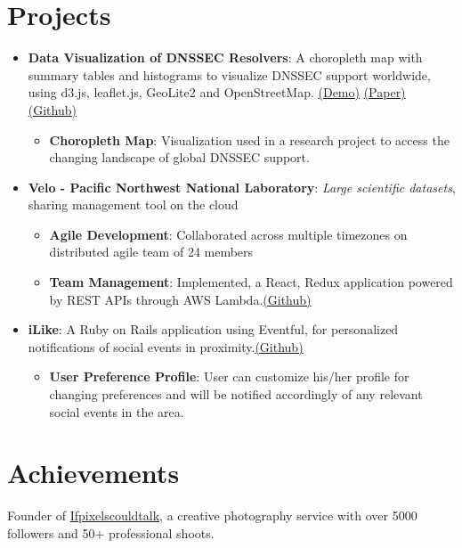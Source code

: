 \documentclass[letterpaper,9pt]{article}
\newcommand{\resumeItem}[2]{
  \item\small{
    \textbf{#1}{: #2 \vspace{-2pt}}
  }
}
\newcommand{\resumeSubItem}[2]{\resumeItem{#1}{#2}\vspace{-4pt}}
\newcommand{\resumeSubHeadingListStart}{\begin{itemize}[leftmargin=*]}
\newcommand{\resumeSubHeadingListEnd}{\end{itemize}}
\newcommand{\resumeItemListStart}{\begin{itemize}}
\newcommand{\resumeItemListEnd}{\end{itemize}\vspace{-5pt}}
\begin{document}
\section{Projects}
  \resumeSubHeadingListStart 
    \resumeSubItem{Data Visualization of DNSSEC Resolvers}
      {A choropleth map with summary tables and histograms to visualize DNSSEC support worldwide, using d3.js, leaflet.js, GeoLite2 and OpenStreetMap. \href{http://ec2-13-59-150-114.us-east-2.compute.amazonaws.com:3000/} {(Demo)} \href{https://drive.google.com/drive/folders/1Oc6g4fNo4LQgKQe8uxul2HIDKMQ-hzQZ/} {(Paper)} \href{https://github.com/shivachaturvedi/dnssec-viz} {(Github)}}
        \resumeItemListStart
            \resumeItem{Choropleth Map}{Visualization used in a research project to access the changing landscape of global DNSSEC support.}
        \resumeItemListEnd
    \resumeSubItem{Velo - Pacific Northwest National Laboratory}{\textit{Large scientific datasets}, sharing management tool on the cloud}
        \resumeItemListStart
            \resumeItem{Agile Development}{Collaborated across multiple timezones on distributed agile team of 24 members}
            \resumeItem{Team Management}{{Implemented, a React, Redux application powered by REST APIs through AWS Lambda.\href{https://github.com/VeloCloud/website-ui}{(Github)}}}
        \resumeItemListEnd
    \resumeSubItem{iLike}
      {A Ruby on Rails application using Eventful, for personalized notifications of social events in proximity.\href{https://github.com/shivachaturvedi/iLike}{(Github)}}
        \resumeItemListStart
            \resumeItem{User Preference Profile}{User can customize his/her profile for changing preferences and will be notified accordingly of any relevant social events in the area.}
        \resumeItemListEnd
    
  \resumeSubHeadingListEnd

%

%
\section{Achievements}
{Founder of \href{https://facebook.com/ifpixelscouldtalk}{Ifpixelscouldtalk}, a creative photography service with over 5000 followers and 50+ professional shoots.}

%
\end{document}
